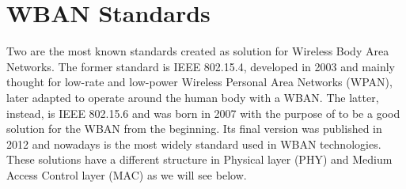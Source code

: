 \documentclass[conference]{IEEEtran}
\begin{document}
\section{WBAN Standards}
Two are the most known standards created as solution for Wireless Body Area Networks. The former standard is IEEE 802.15.4, developed in 2003 and mainly thought for low-rate and low-power Wireless Personal Area Networks (WPAN), later adapted to operate around the human body with a WBAN. The latter, instead, is IEEE 802.15.6 and was born in 2007 with the purpose of to be a good solution for the WBAN from the beginning. Its final version was published in 2012 and nowadays is the most widely standard used in WBAN technologies.
\\These solutions have a different structure in Physical layer (PHY) and Medium Access Control layer (MAC) as we will see below.
\end{document}
